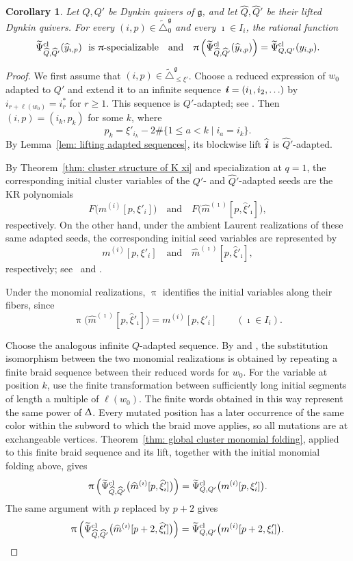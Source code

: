 \documentclass[12pt, leqno]{amsart}
\numberwithin{equation}{section}
\theoremstyle{plain}
\newtheorem{corollary}[lemma]{Corollary}
\theoremstyle{definition}
\newcommand{\hxi}{{\widehat{\xi}}}
\renewcommand{\ge}{\geqslant}
\newcommand{\g}{\mathfrak{g}}
\newcommand{\Dynkin}{\triangle}
\newcommand{\im}{\imath}
\newcommand{\ii}{ \textbf{\textit{i}}}
\newcommand{\hQ}{\widehat{Q}}
\newcommand{\hhm}{\widehat{m}}
\newcommand{\hy}{\widehat{y}}
\newcommand{\hii}{{\widehat{\ii}}}
\newcommand{\tDynkin}{{\widetilde{\Dynkin}}}
\newcommand{\qtq}[1][{and}]{\quad\text{{#1}}\quad}
\newcommand{\tPsi}{{\widetilde{\Psi}}}
\begin{document}
\begin{corollary}
\label{cor: substitution folding}
Let $Q,Q'$ be Dynkin quivers of $\g$, and let
$\hQ,\hQ'$ be their   lifted Dynkin quivers.
For every $(i,p)\in\tDynkin^\g_0$ and every $\im\in I_i$, the
rational function
\[
\tPsi^{\rm cl}_{\hQ,\hQ'}(\hy_{\im,p}) \ \ \text{is $\uppi$-specializable}
\qtq
\uppi\left( \tPsi^{\rm cl}_{\hQ,\hQ'}(\hy_{\im,p}) \right) = \tPsi^{\rm cl}_{Q,Q'}(y_{i,p}).
\]
\end{corollary}

\begin{proof}
We first assume that $(i,p)\in\tDynkin_{\leq\xi'}^\g$.
Choose a reduced expression of $w_0$ adapted to $Q'$ and extend
it to an infinite sequence $\ii=(i_1,i_2,\ldots)$ by
$i_{r+\ell(w_0)}=i_r^*$ for $r\ge1$.
This sequence is $Q'$-adapted; see \cite[(5.11)]{LO24}.
Then $(i,p)=(i_k,p_k)$ for some $k$, where
\[
p_k = \xi'_{i_k} -2\#\{1\leq a<k\mid i_a=i_k\}.
\]
 By Lemma~\ref{lem: lifting adapted sequences}, its blockwise lift{}
$\hii$ is $\hQ'$-adapted.

By Theorem~\ref{thm: cluster structure of K xi} and specialization
at $q=1$, the corresponding initial cluster variables of the
$Q'$- and $\hQ'$-adapted seeds are the KR polynomials
\[
F\bigl(m^{(i)}[p,\xi'_i]\bigr) \qtq  F\bigl(\hhm^{(\im)}[p,\hxi'_\im]\bigr),
\]
respectively.
On the other hand, under the ambient Laurent realizations of these
same adapted seeds, the corresponding initial seed variables are
represented by
\[
m^{(i)}[p,\xi'_i] \qtq \hhm^{(\im)}[p,\hxi'_\im],
\]
respectively; see~\cite{FHOO2} and \cite[Proposition~5.7 and
Theorem~5.12]{LO24}.

Under the monomial realizations, $\uppi$ identifies the initial variables
along their fibers, since
\[
\uppi\bigl(\hhm^{(\im)}[p,\hxi'_\im]\bigr)
=m^{(i)}[p,\xi'_i]
\qquad(\im\in I_i).
\]

Choose the analogous infinite $Q$-adapted sequence.
By \cite[Theorem~6.3 and diagram~(7.1)]{FHOO2} and
\cite[Theorem~5.21 and diagram~(5.19)]{LO24}, the substitution
isomorphism between the two monomial realizations is obtained by
repeating a finite braid sequence between their reduced words
for $w_0$.
 For the variable at position $k$, use the finite transformation
between sufficiently long initial segments of length a multiple of $\ell(w_0)$. The finite words obtained in this way represent the same power of  $\Updelta$.
Every mutated position
has a later occurrence of the same color   within the subword to which the braid move applies, so all mutations are at exchangeable vertices.
Theorem~\ref{thm: global cluster monomial folding}, applied to
this finite braid sequence and its  lift, together with
the initial monomial folding above, gives
\[
\uppi\left(\tPsi^{\rm cl}_{\hQ,\hQ'}\bigl(\hhm^{(\im)}[p,\hxi'_\im]\bigr)\right)
= \tPsi^{\rm cl}_{Q,Q'} \bigl(m^{(i)}[p,\xi'_i]\bigr).
\]
The same argument with $p$ replaced by $p+2$ gives
\[
\uppi\left( \tPsi^{\rm cl}_{\hQ,\hQ'} \bigl(\hhm^{(\im)}[p+2,\hxi'_\im]\bigr) \right)
= \tPsi^{\rm cl}_{Q,Q'} \bigl(m^{(i)}[p+2,\xi'_i]\bigr).
\]


\end{proof}
\end{document}
